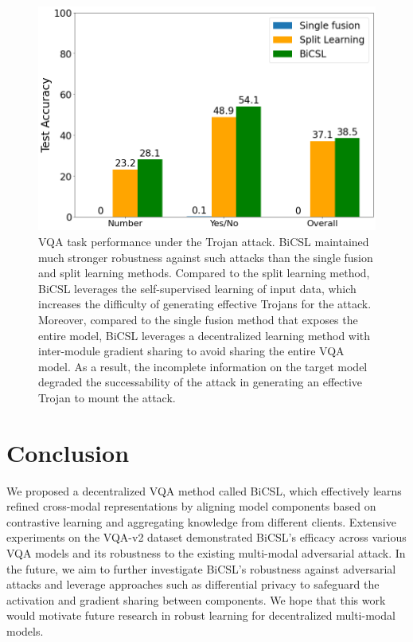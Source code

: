 \documentclass[letterpaper]{article} %
\begin{document}
\begin{figure}[!t]
    \centering
    \includegraphics[width=0.9\linewidth]{figures/robustness.png}
    \caption{VQA task performance under the Trojan attack. BiCSL maintained much stronger robustness against such attacks than the single fusion and split learning methods. Compared to the split learning method, BiCSL leverages the self-supervised learning of input data, which increases the difficulty of generating effective Trojans for the attack. Moreover, compared to the single fusion method that exposes the entire model, BiCSL leverages a decentralized learning method with inter-module gradient sharing to avoid sharing the entire VQA model. As a result, the incomplete information on the target model degraded the successability of the attack in generating an effective Trojan to mount the attack.}
    \label{fig:robustness}
\end{figure}


\section{Conclusion}
We proposed a decentralized VQA method called BiCSL, which effectively learns refined cross-modal representations by aligning model components based on contrastive learning and aggregating knowledge from different clients. Extensive experiments on the VQA-v2 dataset demonstrated BiCSL's efficacy across various VQA models and its robustness to the existing multi-modal adversarial attack. In the future, we aim to further investigate BiCSL's robustness against adversarial attacks and leverage approaches such as differential privacy \cite{dp} to safeguard the activation and gradient sharing between components. We hope that this work would motivate future research in robust learning for decentralized multi-modal models.
\end{document}
